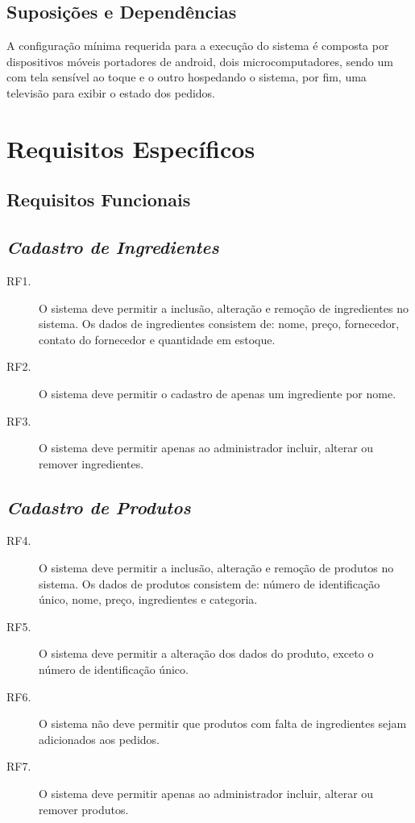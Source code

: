 \documentclass[article, 12pt, oneside, a4paper, brazil]{abntex2}
\begin{document}
 \subsection{Suposições e Dependências}
 A configuração mínima requerida para a execução do sistema é composta por dispositivos móveis portadores de android, dois microcomputadores, sendo um com tela sensível ao toque e o outro hospedando o sistema, por fim, uma televisão para exibir o estado dos pedidos.
 
 \section{Requisitos Específicos} 
 \subsection{Requisitos Funcionais}
 
 \subsection*{\emph{Cadastro de Ingredientes}}
 \begin{description}
  \item[RF1.] O sistema deve permitir a inclusão, alteração e remoção de ingredientes no sistema. Os dados de ingredientes consistem de: nome, preço, fornecedor, contato do fornecedor e quantidade em estoque.
  \item[RF2.] O sistema deve permitir o cadastro de apenas um ingrediente por nome.
  \item[RF3.] O sistema deve permitir apenas ao administrador incluir, alterar ou remover ingredientes.
 \end{description}

 \subsection*{\emph{Cadastro de Produtos}}
 \begin{description}
  \item [RF4.] O sistema deve permitir a inclusão, alteração e remoção de produtos no sistema. Os dados de produtos consistem de: número de identificação único, nome, preço, ingredientes e categoria.
  \item [RF5.] O sistema deve permitir a alteração dos dados do produto, exceto o número de identificação único.
  \item [RF6.] O sistema não deve permitir que produtos com falta de ingredientes sejam adicionados aos pedidos.
  \item [RF7.] O sistema deve permitir apenas ao administrador incluir, alterar ou remover produtos.
 \end{description}
 
\end{document}
